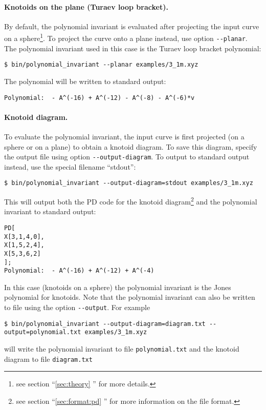 \paragraph{Knotoids on the plane (Turaev loop bracket).}
By default, the polynomial invariant is evaluated after projecting the input curve on a sphere\footnote{see section ``\ref{sec:theory} '' for more details.}. To project the curve onto a plane instead, use option \lstinline{--planar}. The polynomial invariant used in this case is the Turaev loop bracket polynomial:
\begin{lstlisting}
$ bin/polynomial_invariant --planar examples/3_1m.xyz
\end{lstlisting}
The polynomial will be written to standard output:
\begin{lstlisting}
Polynomial:  - A^(-16) + A^(-12) - A^(-8) - A^(-6)*v
\end{lstlisting}

\paragraph{Knotoid diagram.}
To evaluate the polynomial invariant, the input curve is first projected (on a sphere or on a plane) to obtain a knotoid diagram. To save this diagram, specify the output file using option \lstinline{--output-diagram}. To output to standard output instead, use the special filename ``stdout'': 
\begin{lstlisting}
$ bin/polynomial_invariant --output-diagram=stdout examples/3_1m.xyz
\end{lstlisting}
This will output both the PD code for the knotoid diagram\footnote{see section ``\ref{sec:format:pd} '' for more information on the file format.} and the polynomial invariant to standard output:
\begin{lstlisting}
PD[
X[3,1,4,0],
X[1,5,2,4],
X[5,3,6,2]
];
Polynomial:  - A^(-16) + A^(-12) + A^(-4)
\end{lstlisting}
In this case (knotoids on a sphere) the polynomial invariant is the Jones polynomial for knotoids.
Note that the polynomial invariant can also be written to file using the option \lstinline{--output}. For example
\begin{lstlisting}
$ bin/polynomial_invariant --output-diagram=diagram.txt --output=polynomial.txt examples/3_1m.xyz
\end{lstlisting}
will write the polynomial invariant to file \lstinline{polynomial.txt} and the knotoid diagram to file \lstinline{diagram.txt}

